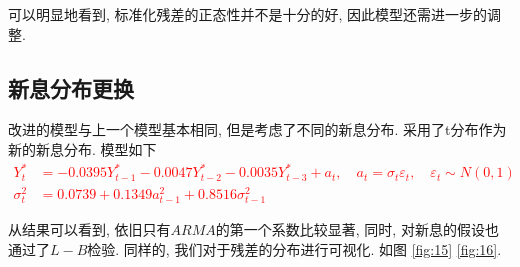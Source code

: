 \documentclass[11pt]{article}
\begin{document}
\qquad 可以明显地看到, 标准化残差的正态性并不是十分的好, 因此模型还需进一步的调整.

\subsection{新息分布更换}
\qquad 改进的模型与上一个模型基本相同, 但是考虑了不同的新息分布. 采用了t分布作为新的新息分布. 模型如下
\textcolor{red}{
\begin{equation*}\begin{aligned}
    Y_{t}^{*} &=-0.0395 Y_{t-1}^{*}-0.0047 Y_{t-2}^{*}-0.0035 Y_{t-3}^{*}+a_{t}, \quad a_{t}=\sigma_{t} \varepsilon_{t}, \quad \varepsilon_{t} \sim N(0,1) \\
    \sigma_{t}^{2} &=0.0739+ 0.1349 a_{t-1}^{2}+0.8516 \sigma_{t-1}^{2}
\end{aligned}\end{equation*}}

\qquad 从结果可以看到, 依旧只有$ARMA$的第一个系数比较显著, 同时, 对新息的假设也通过了$L-B$检验. 同样的, 我们对于残差的分布进行可视化. 如图 \ref{fig:15} \ref{fig:16}.
\end{document}
